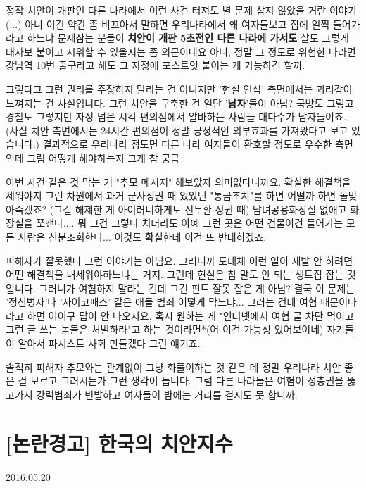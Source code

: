 정작 치안이 개판인 다른 나라에서 이런 사건 터져도 별 문제 삼지 않았을 거란 이야기(...)
아니 이건 약간 좀 비꼬아서 말하면 우리나라에서 왜 여자들보고 집에 일찍 들어가라고 하느냐 문제삼는 분들이
\textbf{치안이 개판 5초전인 다른 나라에 가서도} 살도 그렇게 대자보 붙이고 시위할 수 있을지는 좀 의문이네요
아니, 정말 그 정도로 위험한 나라면 강남역 10번 출구라고 해도 그 자정에 포스트잇 붙이는 게 가능하긴 할까.
\vspace{5mm}

그렇다고 그런 권리를 주장하지 말라는 건 아니지만 '현실 인식' 측면에서는 괴리감이 느껴지는 건 사실입니다.
그런 치안을 구축한 건 일단 '\textbf{남자}'들이 아님?
국방도 그렇고 경찰도 그렇지만 자정 넘은 시각 편의점에서 알바하는 사람들 대다수가 남자들이죠.
(사실 치안 측면에서는 24시간 편의점이 정말 긍정적인 외부효과를 가져왔다고 보고 있습니다.)
결과적으로 우리나라 정도면 다른 나라 여자들이 환호할 정도로 우수한 측면인데 그럼 어떻게 해야하는지 그게 참 궁금
\vspace{5mm}

이번 사건 같은 것 막는 거 "추모 메시지" 해보았자 의미없다니까요.
확실한 해결책을 세워야지
그런 차원에서 과거 군사정권 때 있었던 "통금조치"를 하면 어떨까 하면 돌맞아죽겠죠? (그걸 해제한 게 아이러니하게도 전두환 정권 때)
남녀공용화장실 없애고 화장실을 쪼갠다.... 뭐 그건 그렇다 치더라도
아예 그런 곳은 어떤 건물이건 들어가는 모든 사람은 신분조회한다... 이것도 확실한데 이건 또 반대하겠죠.
\vspace{5mm}

피해자가 잘못했다 그런 이야기는 아님요. 그러니까 도대체 이런 일이 재발 안 하려면 어떤 해결책을 내세워야하느냐는 거지.
그런데 현실은 참 말도 안 되는 생트집 잡는 것입니다. 그러니가 여혐하지 말라는 건데 그건 핀트 잘못 잡은 게 아님?
결국 이 문제는 '정신병자'나 '사이코패스' 같은 애들 범죄 어떻게 막느냐... 그러는 건데 여혐 때문이다라고 하면 어이구 답이 안 나오지요.
혹시 원하는 게 "인터넷에서 여혐 글 차단 먹이고 그런 글 쓰는 놈들은 처벌하라"고 하는 것이라면*(어 이건 가능성 있어보이네)
자기들이 알아서 파시스트 사회 만들겠다 그런 얘기죠.
\vspace{5mm}

솔직히 피해자 추모와는 관계없이 그냥 화풀이하는 것 같은 데 정말 우리나라 치안 좋은 걸 모르고 그러시는가 그런 생각이 듭니다.
그럼 다른 나라들은 여혐이 성층권을 뚫고가서 강력범죄가 빈발하고 여자들이 밤에는 거리를 걷지도 못 합니까.
\vspace{5mm}






\section{[논란경고] 한국의 치안지수}
\href{https://www.kockoc.com/Apoc/784560}{2016.05.20}

